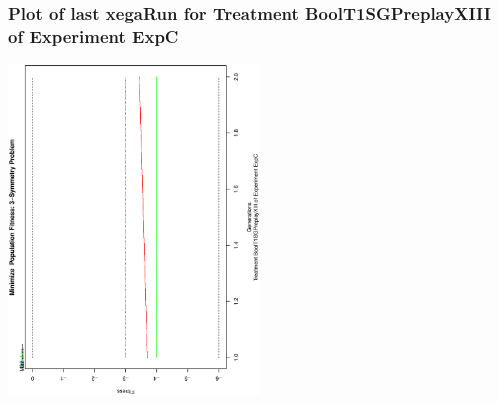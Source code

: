  \begin{frame}
 \frametitle{ Plot of last xegaRun for Treatment BoolT1SGPreplayXIII of Experiment ExpC }
 \begin{center}
\includegraphics[width=0.5\textwidth, angle=-90]
{ExpCPlotPopStatsFigure000.eps}
 \end{center}
 \label{report/ExpCPlotPopStatsFigure000.eps}  
 \end{frame}

